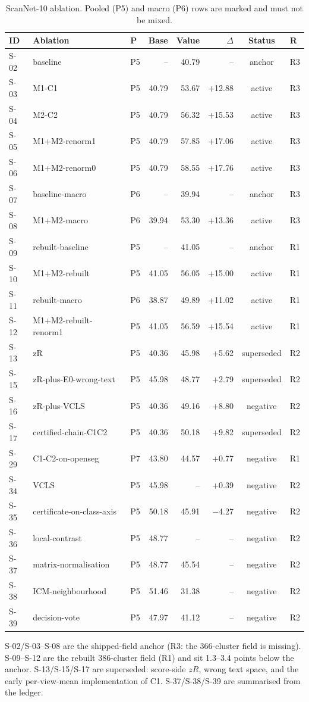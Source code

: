 \begin{table}[t]
\centering
\small
\caption{ScanNet-10 ablation. Pooled (P5) and macro (P6) rows are marked and must not be mixed.}
\label{tab:abl-scannet}
\begin{tabular}{lllrrrcl}
\toprule
ID & Ablation & P & Base & Value & $\Delta$ & Status & R \\
\midrule
S-02 & baseline & P5 & -- & 40.79 & -- & anchor & R3 \\
S-03 & M1-C1 & P5 & 40.79 & 53.67 & +12.88 & active & R3 \\
S-04 & M2-C2 & P5 & 40.79 & 56.32 & +15.53 & active & R3 \\
S-05 & M1+M2-renorm1 & P5 & 40.79 & 57.85 & +17.06 & active & R3 \\
S-06 & M1+M2-renorm0 & P5 & 40.79 & 58.55 & +17.76 & active & R3 \\
S-07 & baseline-macro & P6 & -- & 39.94 & -- & anchor & R3 \\
S-08 & M1+M2-macro & P6 & 39.94 & 53.30 & +13.36 & active & R3 \\
S-09 & rebuilt-baseline & P5 & -- & 41.05 & -- & anchor & R1 \\
S-10 & M1+M2-rebuilt & P5 & 41.05 & 56.05 & +15.00 & active & R1 \\
S-11 & rebuilt-macro & P6 & 38.87 & 49.89 & +11.02 & active & R1 \\
S-12 & M1+M2-rebuilt-renorm1 & P5 & 41.05 & 56.59 & +15.54 & active & R1 \\
S-13 & zR & P5 & 40.36 & 45.98 & +5.62 & superseded & R2 \\
S-15 & zR-plus-E0-wrong-text & P5 & 45.98 & 48.77 & +2.79 & superseded & R2 \\
S-16 & zR-plus-VCLS & P5 & 40.36 & 49.16 & +8.80 & negative & R2 \\
S-17 & certified-chain-C1C2 & P5 & 40.36 & 50.18 & +9.82 & superseded & R2 \\
S-29 & C1-C2-on-openseg & P7 & 43.80 & 44.57 & +0.77 & negative & R1 \\
S-34 & VCLS & P5 & 45.98 & -- & +0.39 & negative & R2 \\
S-35 & certificate-on-class-axis & P5 & 50.18 & 45.91 & $-$4.27 & negative & R2 \\
S-36 & local-contrast & P5 & 48.77 & -- & -- & negative & R2 \\
S-37 & matrix-normalisation & P5 & 48.77 & 45.54 & -- & negative & R2 \\
S-38 & ICM-neighbourhood & P5 & 51.46 & 31.38 & -- & negative & R2 \\
S-39 & decision-vote & P5 & 47.97 & 41.12 & -- & negative & R2 \\
\bottomrule
\end{tabular}
\par\smallskip\footnotesize S-02/S-03--S-08 are the shipped-field anchor (R3: the 366-cluster field is missing). S-09--S-12 are the rebuilt 386-cluster field (R1) and sit 1.3--3.4 points below the anchor. S-13/S-15/S-17 are superseded: score-side $zR$, wrong text space, and the early per-view-mean implementation of C1. S-37/S-38/S-39 are summarised from the ledger.
\end{table}
